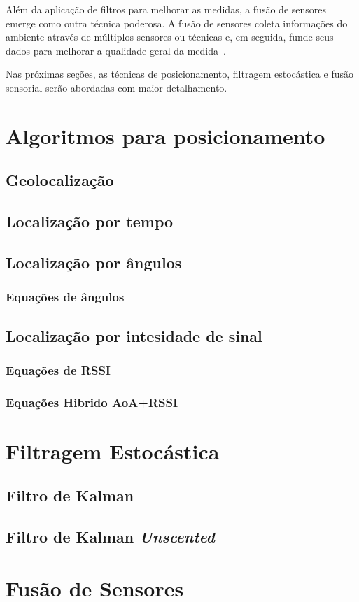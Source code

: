 Além da aplicação de filtros para melhorar as medidas, a fusão de sensores emerge como outra técnica poderosa. A fusão de sensores coleta informações do ambiente através de múltiplos sensores ou técnicas e, em seguida, funde seus dados para melhorar a qualidade geral da medida~\cite{Assa2015}.

Nas próximas seções, as técnicas de posicionamento, filtragem estocástica e fusão sensorial serão abordadas com maior detalhamento.

\section{Algoritmos para posicionamento}
\label{sec:algoritmos}

\subsection{Geolocalização}
\label{subsec:geolocalizacao}

\subsection{Localização por tempo}
\label{subsec:angulos}

\subsection{Localização por ângulos}
\label{subsec:angulos}

\subsubsection{Equações de ângulos}

\subsection{Localização por intesidade de sinal}
\label{subsec:radiofrequencia}

\subsubsection{Equações de RSSI}

\subsubsection{Equações Hibrido AoA+RSSI}


\section{Filtragem Estocástica}
\label{sec:filtragem}

\subsection{Filtro de Kalman}
\label{subsec:kf}

\subsection{Filtro de Kalman \textit{Unscented}}
\label{subsec:ukf}

\section{Fusão de Sensores}
\label{sec:fusao}

